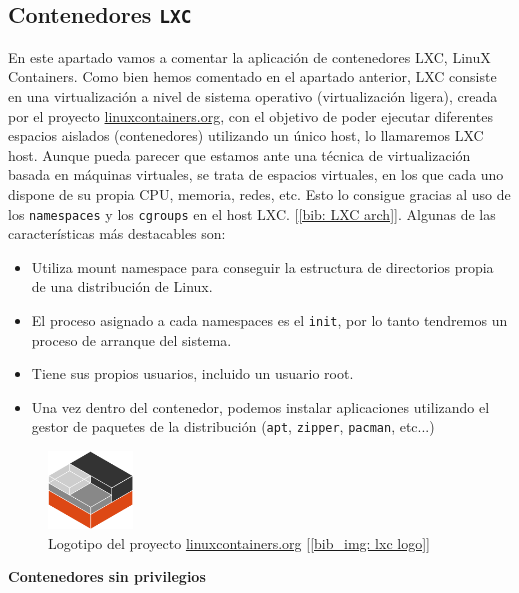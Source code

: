 \documentclass[12pt]{article}
\begin{document}
	\subsection{Contenedores \texttt{LXC}}
	\noindent En este apartado vamos a comentar la aplicación de contenedores LXC, LinuX Containers. Como bien hemos comentado en el apartado anterior, LXC consiste en una virtualización a nivel de sistema operativo (virtualización ligera), creada por el proyecto \url{linuxcontainers.org}, con el objetivo de poder ejecutar diferentes espacios aislados (contenedores) utilizando un único host, lo llamaremos LXC host. Aunque pueda parecer que estamos ante una técnica de virtualización basada en máquinas virtuales, se trata de espacios virtuales, en los que cada uno dispone de su propia CPU, memoria, redes, etc. Esto lo consigue gracias al uso de los \texttt{namespaces} y los \texttt{cgroups} en el host LXC. [\ref{bib: LXC arch}]. Algunas de las características más destacables son:
	\begin{itemize}
		\item Utiliza mount namespace para conseguir la estructura de directorios propia de una distribución de Linux.
		\item El proceso asignado a cada namespaces es el \texttt{init}, por lo tanto tendremos un proceso de arranque del sistema.
		\item Tiene sus propios usuarios, incluido un usuario root.
		\item Una vez dentro del contenedor, podemos instalar aplicaciones utilizando el gestor de paquetes de la distribución (\texttt{apt}, \texttt{zipper}, \texttt{pacman}, etc...)
	\end{itemize}

	\begin{figure}[h]
		\begin{center}
			\includegraphics[width=0.2\textwidth]{img/lxc_logo.png}
			\caption{Logotipo del proyecto \url{linuxcontainers.org} [\ref{bib_img: lxc logo}]}
		\end{center}
	\end{figure}

	\noindent \textbf{\large Contenedores sin privilegios}\\
\end{document}
